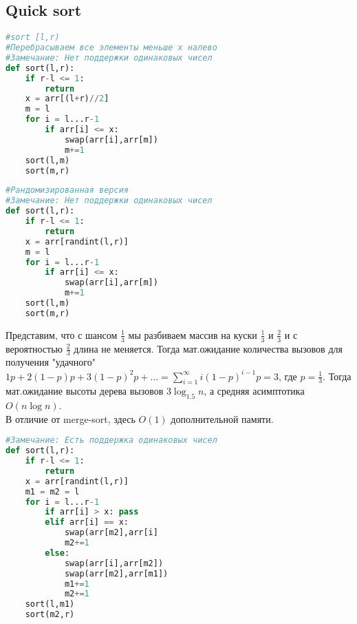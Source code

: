 \documentclass[12pt]{article}
\begin{document}
\subsection{Quick sort}
\begin{lstlisting}[language=Python]
#sort [l,r)
#Перебрасываем все элементы меньше x налево
#Замечание: Нет поддержки одинаковых чисел
def sort(l,r):
    if r-l <= 1:
        return
    x = arr[(l+r)//2]
    m = l
    for i = l...r-1
        if arr[i] <= x:
            swap(arr[i],arr[m])
            m+=1
    sort(l,m)
    sort(m,r)
\end{lstlisting}
\begin{lstlisting}[language=Python]
#Рандомизированная версия
#Замечание: Нет поддержки одинаковых чисел
def sort(l,r):
    if r-l <= 1:
        return
    x = arr[randint(l,r)]
    m = l
    for i = l...r-1
        if arr[i] <= x:
            swap(arr[i],arr[m])
            m+=1
    sort(l,m)
    sort(m,r)
\end{lstlisting}
Представим, что с шансом $\frac13$ мы разбиваем массив на куски $\frac13$ и $\frac23$ и с вероятностью $\frac23$ длина не меняется.
Тогда мат.ожидание количества вызовов для получения "удачного" $1p+2(1-p)p+3(1-p)^2p+\ldots=\sum\limits_{i=1}^\infty i(1-p)^{i-1}p = 3$, где $p=\frac13$. Тогда мат.ожидание высоты дерева вызовов $3\log_{1.5} n$, а средняя асимптотика $O(n\log n)$.\\
В отличие от merge-sort, здесь $O(1)$ дополнительной памяти.
\begin{lstlisting}[language=Python]
#Замечание: Есть поддержка одинаковых чисел
def sort(l,r):
    if r-l <= 1:
        return
    x = arr[randint(l,r)]
    m1 = m2 = l
    for i = l...r-1
        if arr[i] > x: pass
        elif arr[i] == x:
            swap(arr[m2],arr[i]
            m2+=1
        else:
            swap(arr[i],arr[m2])
            swap(arr[m2],arr[m1])
            m1+=1
            m2+=1
    sort(l,m1)
    sort(m2,r)
\end{lstlisting}
\end{document}
